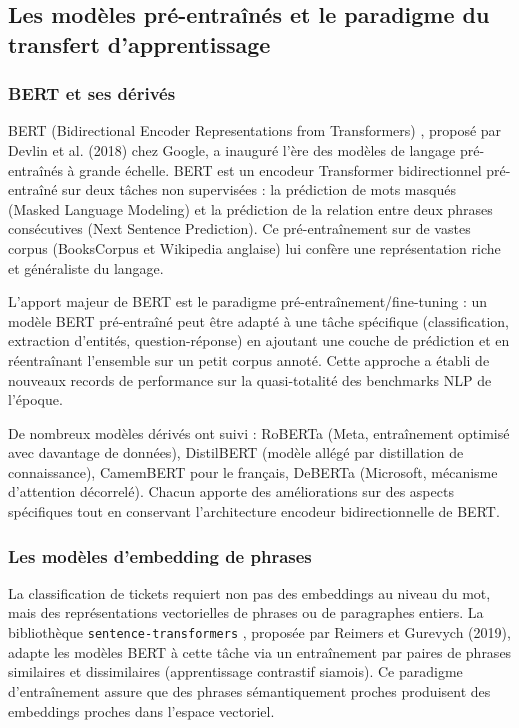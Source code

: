 \subsection{Les modèles pré-entraînés et le paradigme du transfert d'apprentissage}

\subsubsection{BERT et ses dérivés}

BERT (Bidirectional Encoder Representations from Transformers) \cite{logo:bert}, proposé par Devlin et al. (2018) chez Google, a inauguré l'ère des modèles de langage pré-entraînés à grande échelle. BERT est un encodeur Transformer bidirectionnel pré-entraîné sur deux tâches non supervisées : la prédiction de mots masqués (Masked Language Modeling) et la prédiction de la relation entre deux phrases consécutives (Next Sentence Prediction). Ce pré-entraînement sur de vastes corpus (BooksCorpus et Wikipedia anglaise) lui confère une représentation riche et généraliste du langage.

L'apport majeur de BERT est le paradigme pré-entraînement/fine-tuning : un modèle BERT pré-entraîné peut être adapté à une tâche spécifique (classification, extraction d'entités, question-réponse) en ajoutant une couche de prédiction et en réentraînant l'ensemble sur un petit corpus annoté. Cette approche a établi de nouveaux records de performance sur la quasi-totalité des benchmarks NLP de l'époque.

De nombreux modèles dérivés ont suivi : RoBERTa \cite{logo:roberta} (Meta, entraînement optimisé avec davantage de données), DistilBERT (modèle allégé par distillation de connaissance), CamemBERT pour le français, DeBERTa (Microsoft, mécanisme d'attention décorrelé). Chacun apporte des améliorations sur des aspects spécifiques tout en conservant l'architecture encodeur bidirectionnelle de BERT.

\subsubsection{Les modèles d'embedding de phrases}

La classification de tickets requiert non pas des embeddings au niveau du mot, mais des représentations vectorielles de phrases ou de paragraphes entiers. La bibliothèque \texttt{sentence-transformers} \cite{logo:sentence_transformers}, proposée par Reimers et Gurevych (2019), adapte les modèles BERT à cette tâche via un entraînement par paires de phrases similaires et dissimilaires (apprentissage contrastif siamois). Ce paradigme d'entraînement assure que des phrases sémantiquement proches produisent des embeddings proches dans l'espace vectoriel.

